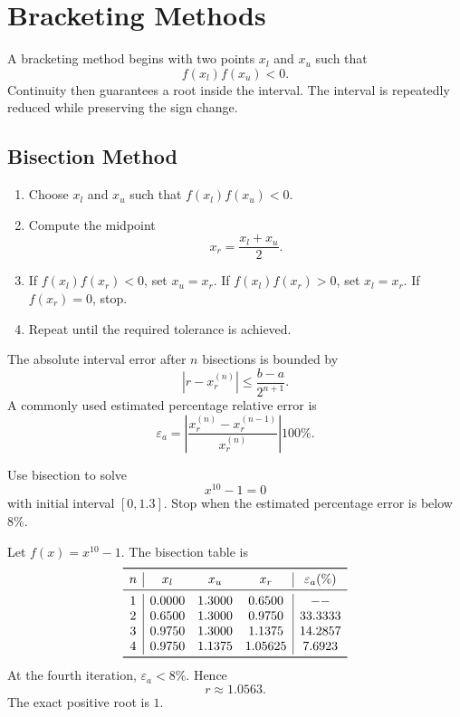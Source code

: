 \section{Bracketing Methods}

A bracketing method begins with two points $x_l$ and $x_u$ such that
\[
 f(x_l)f(x_u)<0.
\]
Continuity then guarantees a root inside the interval.  The interval is repeatedly reduced while preserving the sign change.

\subsection{Bisection Method}

\begin{algorithm}[Bisection]
\begin{enumerate}
  \item Choose $x_l$ and $x_u$ such that $f(x_l)f(x_u)<0$.
  \item Compute the midpoint
  \[
    x_r=\frac{x_l+x_u}{2}.
  \]
  \item If $f(x_l)f(x_r)<0$, set $x_u=x_r$.  If $f(x_l)f(x_r)>0$, set $x_l=x_r$.  If $f(x_r)=0$, stop.
  \item Repeat until the required tolerance is achieved.
\end{enumerate}
\end{algorithm}

The absolute interval error after $n$ bisections is bounded by
\[
 |r-x_r^{(n)}|\le\frac{b-a}{2^{n+1}}.
\]
A commonly used estimated percentage relative error is
\[
 \varepsilon_a
 =\left|\frac{x_r^{(n)}-x_r^{(n-1)}}{x_r^{(n)}}\right|100\%.
\]

\begin{example}
Use bisection to solve
\[
 x^{10}-1=0
\]
with initial interval $[0,1.3]$.  Stop when the estimated percentage error is below $8\%$.
\end{example}

\begin{solution}[7.0cm]
Let $f(x)=x^{10}-1$.  The bisection table is
\[
\begin{array}{c|ccc|c}
\toprule
n&x_l&x_u&x_r&\varepsilon_a(\%)\\
\midrule
1&0.0000&1.3000&0.6500&--\\
2&0.6500&1.3000&0.9750&33.3333\\
3&0.9750&1.3000&1.1375&14.2857\\
4&0.9750&1.1375&1.05625&7.6923\\
\bottomrule
\end{array}
\]
At the fourth iteration, $\varepsilon_a<8\%$.  Hence
\[
 r\approx1.0563.
\]
The exact positive root is $1$.
\end{solution}

